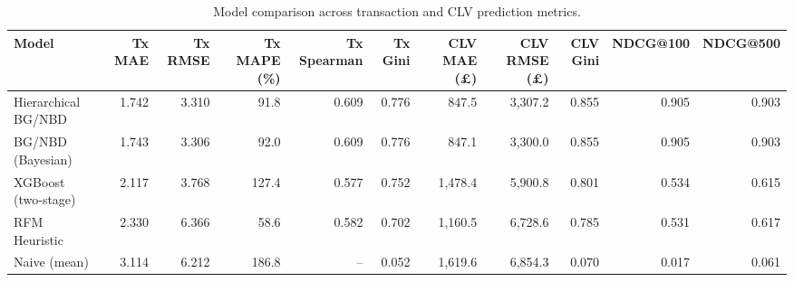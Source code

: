 \begin{table}[htbp]
\centering
\caption{Model comparison across transaction and CLV prediction metrics.}
\label{tab:metrics_comparison}
\begin{adjustbox}{max width=\linewidth}
\begin{tabular}{lrrrrrrrrrr}
\toprule
Model & Tx MAE & Tx RMSE & Tx MAPE (\%) & Tx Spearman & Tx Gini & CLV MAE (\pounds) & CLV RMSE (\pounds) & CLV Gini & NDCG@100 & NDCG@500 \\
\midrule
Hierarchical BG/NBD & 1.742 & 3.310 & 91.8 & 0.609 & 0.776 & 847.5 & 3,307.2 & 0.855 & 0.905 & 0.903 \\
BG/NBD (Bayesian) & 1.743 & 3.306 & 92.0 & 0.609 & 0.776 & 847.1 & 3,300.0 & 0.855 & 0.905 & 0.903 \\
XGBoost (two-stage) & 2.117 & 3.768 & 127.4 & 0.577 & 0.752 & 1,478.4 & 5,900.8 & 0.801 & 0.534 & 0.615 \\
RFM Heuristic & 2.330 & 6.366 & 58.6 & 0.582 & 0.702 & 1,160.5 & 6,728.6 & 0.785 & 0.531 & 0.617 \\
Naive (mean) & 3.114 & 6.212 & 186.8 & -- & 0.052 & 1,619.6 & 6,854.3 & 0.070 & 0.017 & 0.061 \\
\bottomrule
\end{tabular}
\end{adjustbox}
\end{table}
